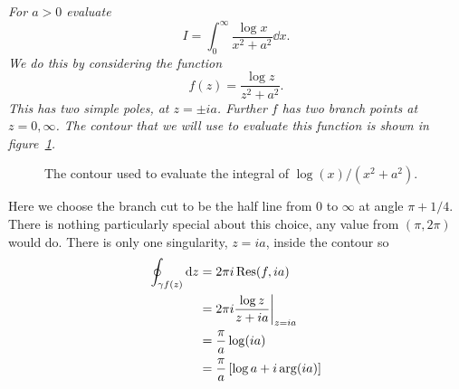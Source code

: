 \documentclass{article}
\begin{document}
    \begin{example}
        \itshape
        For \(a > 0\) evaluate
        \[I = \int_{0}^{\infty} \frac{\log x}{x^2 + a^2} \dd{x}.\]
        \normalfont
        We do this by considering the function
        \[f(z) = \frac{\log z}{z^2 + a^2}.\]
        This has two simple poles, at \(z = \pm ia\).
        Further \(f\) has two branch points at \(z = 0, \infty\).
        The contour that we will use to evaluate this function is shown in figure~\ref{fig:contour for log x/x^2 + a^2}.
        \begin{figure}[ht]
            \centering
            \tikzexternalenable
            \tikzexternaldisable
            \caption{The contour used to evaluate the integral of \(\log(x)/(x^2 + a^2)\).}
            \label{fig:contour for log x/x^2 + a^2}
        \end{figure}
        Here we choose the branch cut to be the half line from \(0\) to \(\infty\) at angle \(\pi + 1/4\).
        There is nothing particularly special about this choice, any value from \((\pi, 2\pi)\) would do.
        There is only one singularity, \(z = ia\), inside the contour so
        \begin{align*}
            \oint_{\gamma f(z)}\dd{z} &= 2\pi i\Res(f, ia)\\
            &= 2\pi i \frac{\log z}{z + ia}\bigg|_{z=ia}\\
            &= \frac{\pi}{a} \log(ia)\\
            &= \frac{\pi}{a}\left[ \log a + i\arg(ia) \right]\\

\end{align*}
\end{example}
\end{document}
